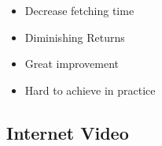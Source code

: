 \begin{itemize}
\begin{itemize}
                \begin{itemize}
                    \item Decrease fetching time
                    \item Diminishing Returns
                \end{itemize}
                \begin{itemize}
                    \item Great improvement
                    \item Hard to achieve in practice
                \end{itemize}
        \end{itemize}
\end{itemize}

\subsection{Internet Video}
